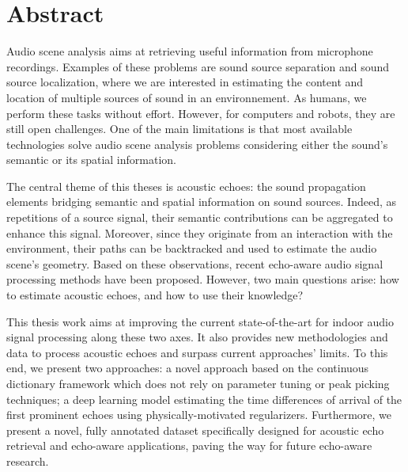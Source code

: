 \chapter*{Abstract}

Audio scene analysis aims at retrieving useful information from microphone recordings.
Examples of these problems are sound source separation and sound source localization, where we are interested in estimating the content and location of multiple sources of sound in an environnement.
As humans, we perform these tasks without effort. However, for computers and robots, they are still open challenges.
One of the main limitations is that most available technologies solve audio scene analysis problems considering either the sound's semantic or its spatial information.

\mynewline
The central theme of this theses is acoustic echoes: the sound propagation elements bridging semantic and spatial information on sound sources.
Indeed, as repetitions of a source signal, their semantic contributions can be aggregated to enhance this signal.
Moreover, since they originate from an interaction with the environment, their paths can be backtracked and used to estimate the audio scene's geometry.
Based on these observations, recent echo-aware audio signal processing methods have been proposed.
However, two main questions arise: how to estimate acoustic echoes, and how to use their knowledge?

\mynewline
This thesis work aims at improving the current state-of-the-art for indoor audio signal processing along these two axes.
It also provides new methodologies and data to process acoustic echoes and surpass current approaches' limits.
To this end, we present two approaches:
a novel approach based on the  continuous dictionary framework which does not rely on parameter tuning or peak picking techniques;
a deep learning model estimating the time differences of arrival of the first prominent echoes using physically-motivated regularizers.
Furthermore, we present a novel, fully annotated dataset specifically designed for acoustic echo retrieval and echo-aware applications, paving the way for future echo-aware research.

